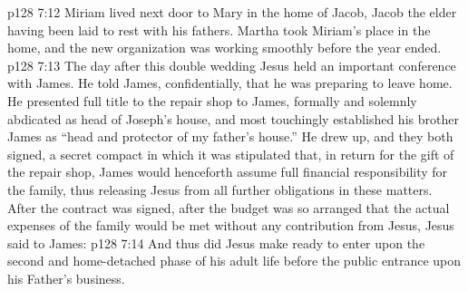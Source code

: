 \vs p128 7:12 Miriam lived next door to Mary in the home of Jacob, Jacob the elder having been laid to rest with his fathers. Martha took Miriam’s place in the home, and the new organization was working smoothly before the year ended.
\vs p128 7:13 \pc The day after this double wedding Jesus held an important conference with James. He told James, confidentially, that he was preparing to leave home. He presented full title to the repair shop to James, formally and solemnly abdicated as head of Joseph’s house, and most touchingly established his brother James as “head and protector of my father’s house.” He drew up, and they both signed, a secret compact in which it was stipulated that, in return for the gift of the repair shop, James would henceforth assume full financial responsibility for the family, thus releasing Jesus from all further obligations in these matters. After the contract was signed, after the budget was so arranged that the actual expenses of the family would be met without any contribution from Jesus, Jesus said to James: 
\vs p128 7:14 And thus did Jesus make ready to enter upon the second and home\hyp{}detached phase of his adult life before the public entrance upon his Father’s business.
\quizlink

